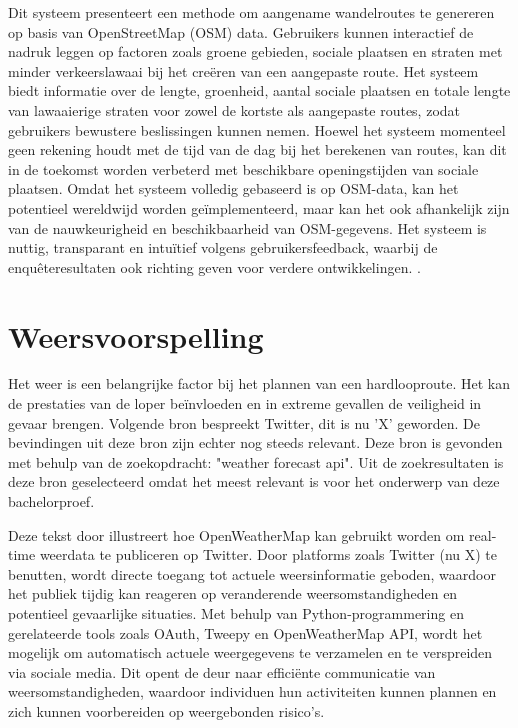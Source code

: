     \hspace{2cm}

    \textcite{Novack2018} 
    Dit systeem presenteert een methode om aangename wandelroutes te genereren op basis van OpenStreetMap (OSM) data. 
    Gebruikers kunnen interactief de nadruk leggen op factoren zoals groene gebieden, 
    sociale plaatsen en straten met minder verkeerslawaai bij het creëren van een aangepaste route. 
    Het systeem biedt informatie over de lengte, groenheid, aantal sociale plaatsen en totale lengte van lawaaierige straten 
    voor zowel de kortste als aangepaste routes, zodat gebruikers bewustere beslissingen kunnen nemen. 
    Hoewel het systeem momenteel geen rekening houdt met de tijd van de dag bij het berekenen van routes, 
    kan dit in de toekomst worden verbeterd met beschikbare openingstijden van sociale plaatsen. 
    Omdat het systeem volledig gebaseerd is op OSM-data, kan het potentieel wereldwijd worden geïmplementeerd, 
    maar kan het ook afhankelijk zijn van de nauwkeurigheid en beschikbaarheid van OSM-gegevens. 
    Het systeem is nuttig, transparant en intuïtief volgens gebruikersfeedback, 
    waarbij de enquêteresultaten ook richting geven voor verdere ontwikkelingen.
    \autocite{Novack2018}.

    \section{Weersvoorspelling}

    Het weer is een belangrijke factor bij het plannen van een hardlooproute. Het kan de prestaties van de loper beïnvloeden en in extreme gevallen de veiligheid in gevaar brengen.
    Volgende bron bespreekt Twitter, dit is nu 'X' geworden. De bevindingen uit deze bron zijn echter nog steeds relevant.
    Deze bron is gevonden met behulp van de zoekopdracht: "weather forecast api". Uit de zoekresultaten is deze bron geselecteerd omdat het meest relevant is voor het onderwerp van deze bachelorproef.

    Deze tekst door \textcite{dewi2019} illustreert hoe OpenWeatherMap kan gebruikt worden om real-time weerdata te publiceren op Twitter.
    Door platforms zoals Twitter (nu X) te benutten, wordt directe toegang tot actuele weersinformatie geboden, waardoor het publiek tijdig kan reageren op veranderende weersomstandigheden en potentieel gevaarlijke situaties.
    Met behulp van Python-programmering en gerelateerde tools zoals OAuth, Tweepy en OpenWeatherMap API, wordt het mogelijk om automatisch actuele weergegevens te verzamelen en te verspreiden via sociale media. 
    Dit opent de deur naar efficiënte communicatie van weersomstandigheden, waardoor individuen hun activiteiten kunnen plannen en zich kunnen voorbereiden op weergebonden risico's.


